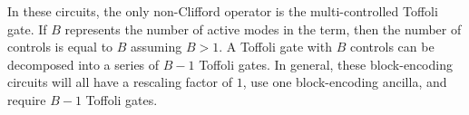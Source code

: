 In these circuits, the only non-Clifford operator is the multi-controlled Toffoli gate.
If $B$ represents the number of active modes in the term, then the number of controls is equal to $B$ assuming $B > 1$.
A Toffoli gate with $B$ controls can be decomposed into a series of $B-1$ Toffoli gates. 
In general, these block-encoding circuits will all have a rescaling factor of $1$, use one block-encoding ancilla, and require $B-1$ Toffoli gates.





